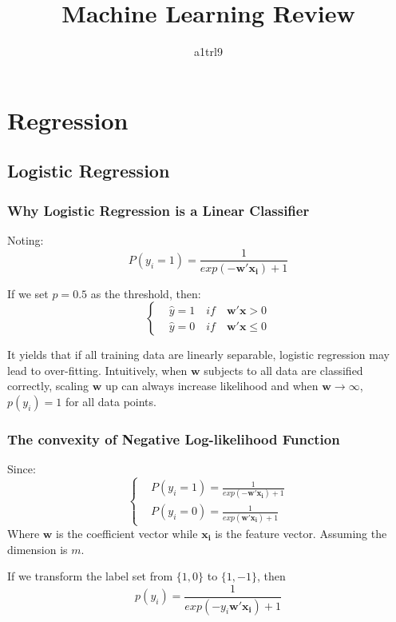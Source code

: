 \documentclass{article}
\author{a1trl9}
\title{Machine Learning Review}
\date{}
\newcommand{\V}[1]{\boldsymbol{#1}}
\begin{document}
\maketitle
\section{Regression}
\subsection{Logistic Regression}
\subsubsection{Why Logistic Regression is a Linear Classifier}

Noting:
\begin{equation}
P(y_i=1)=\frac{1}{exp(-\V{w'}\V{x_i})+1}
\end{equation}

If we set \(p=0.5\) as the threshold, then:
\begin{equation}
\left\{
\begin{split}
&\hat{y}=1 \quad if \quad \V{w'}\V{x}>0\\
&\hat{y}=0 \quad if \quad \V{w'}\V{x}\leq0
\end{split}
\right.
\end{equation}

It yields that if all training data are linearly separable, logistic regression
may lead to over-fitting. Intuitively, when \(\V{w}\) subjects to all data are
classified correctly, scaling \(\V{w}\) up can always increase likelihood and when
\(\V{w} \to \infty\), \(p(y_i)=1\) for all data points.

\subsubsection{The convexity of Negative Log-likelihood Function}

Since:
\begin{equation}
\left\{
\begin{split}
&P(y_i=1)=\frac{1}{exp(-\V{w'}\V{x_i})+1}\\
&P(y_i=0)=\frac{1}{exp(\V{w'}\V{x_i})+1}
\end{split}
\right.
\end{equation}
Where \(\V{w}\) is the coefficient vector while \(\V{x_i}\) is the feature vector.
Assuming the dimension is \(m\).

If we transform the label set from \(\{1, 0\}\) to \(\{1, -1\}\), then
\begin{equation}
p(y_i)=\frac{1}{exp(-y_i\V{w'}\V{x_i})+1}
\end{equation}
\end{document}
